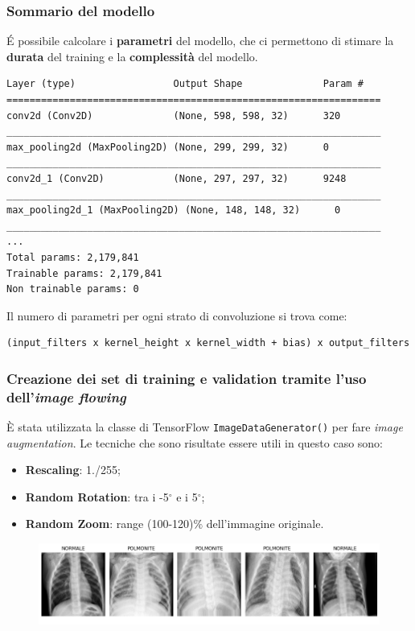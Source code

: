 \documentclass{beamer}
\begin{document}
\begin{frame}[fragile]
	\frametitle{Sommario del modello}
	
É possibile calcolare i \textbf{parametri} del modello, che ci permettono di stimare la \textbf{durata} del training 
e la \textbf{complessità} del modello.
\begin{lstlisting}[basicstyle=\tiny, numbers = none]
Layer (type)                 Output Shape              Param #   
=================================================================
conv2d (Conv2D)              (None, 598, 598, 32)      320       
_________________________________________________________________
max_pooling2d (MaxPooling2D) (None, 299, 299, 32)      0         
_________________________________________________________________
conv2d_1 (Conv2D)            (None, 297, 297, 32)      9248      
_________________________________________________________________
max_pooling2d_1 (MaxPooling2D) (None, 148, 148, 32)      0         
_________________________________________________________________
...
Total params: 2,179,841
Trainable params: 2,179,841
Non trainable params: 0
\end{lstlisting}
Il numero di parametri per ogni strato di convoluzione si trova come:
\begin{lstlisting}[basicstyle=\tiny, numbers = none]
(input_filters x kernel_height x kernel_width + bias) x output_filters
\end{lstlisting}
\end{frame}


\begin{frame}
	\frametitle{Creazione dei set di training e validation tramite l'uso dell'\emph{image flowing}}
	È stata utilizzata la classe di TensorFlow \lstinline{ImageDataGenerator()} per fare \emph{image augmentation}.
	Le tecniche che sono risultate essere utili in questo caso sono:
	\begin{itemize}
	  \item \textbf{Rescaling}: 1./255;
	  \item \textbf{Random Rotation}: tra i -5$^\circ$  e i 5$^\circ$;
	   \item \textbf{Random Zoom}: range (100-120)$\%$ dell'immagine originale.
	\end{itemize}
	\begin{figure}
		\includegraphics[width=1\textwidth]{best-augmented-images-pneumonia.png}
	\end{figure}

	
\end{frame}
\end{document}
